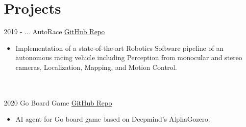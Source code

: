 \documentclass[letterpaper]{twentysecondcv} %
\begin{document}
\section{Projects }{\faClipboard}
\begin{twenty}
	    \twentyitem
   		{2019 - ...}
		{}
        {AutoRace}
        {\href{https://github.com/curtfs/CURT-FSAI/}{GitHub Repo}}
        {}
        {\vspace{-2mm}\begin{itemize}[topsep=0pt,partopsep=0pt]
				\item  Implementation of a state-of-the-art Robotics Software pipeline of an autonomous racing vehicle including Perception from monocular and stereo cameras, Localization, Mapping, and Motion Control.
       
    \end{itemize}} \\\\
			
	    \twentyitem
   		{2020}
		{}
        {Go Board Game}
        {\href{https://github.com/JoGo20/Implementation/}{GitHub Repo}}
        {}
        {\vspace{-2mm}\begin{itemize}[topsep=0pt,partopsep=0pt]
				\item  AI agent for Go board game based on Deepmind's AlphaGozero.
       
    \end{itemize}} \\\\
		

	
		
	
\end{twenty}
\end{document}
